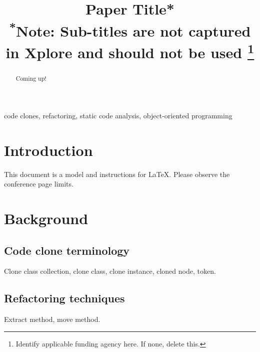\documentclass[conference]{IEEEtran}
\begin{document}
\title{Paper Title*\\
{\footnotesize \textsuperscript{*}Note: Sub-titles are not captured in Xplore and
should not be used}
\thanks{Identify applicable funding agency here. If none, delete this.}
}

\author{
\and
{}
}

\maketitle

\begin{abstract}
Coming up!
\end{abstract}

\begin{IEEEkeywords}
code clones, refactoring, static code analysis, object-oriented programming
\end{IEEEkeywords}

\section{Introduction}
This document is a model and instructions for \LaTeX.
Please observe the conference page limits.

\section{Background}

\subsection{Code clone terminology}
Clone class collection, clone class, clone instance, cloned node, token.

\subsection{Refactoring techniques}
Extract method, move method.
\end{document}
